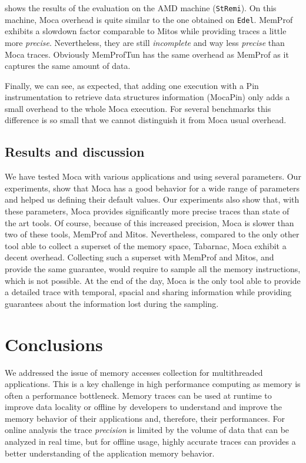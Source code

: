  shows the results of the evaluation on the AMD machine
(\texttt{StRemi}). On this machine, \gls{Moca} overhead is quite similar to the one
obtained on \texttt{Edel}.
\gls{MemProf} exhibits a slowdown factor comparable to \gls{Mitos} while
providing traces a little more \emph{precise}. Nevertheless, they are still \emph{incomplete} and
way less \emph{precise} than \gls{Moca} traces. Obviously MemProfTun has the same
overhead as \gls{MemProf} as it captures the same amount of data.

Finally, we can see, as expected, that adding one execution with a Pin instrumentation to retrieve data structures information (MocaPin) only adds a small overhead to the whole \gls{Moca} execution.
For several benchmarks this difference is so small that we cannot distinguish it from \gls{Moca} usual overhead.

\subsection{Results and discussion}

We have tested \gls{Moca} with various applications and using several parameters.
Our experiments, show that \gls{Moca} has a good behavior for a wide range of parameters and helped us defining their default values.
Our experiments also show that, with these parameters, \gls{Moca} provides significantly more precise traces than state of the art tools.
Of course, because of this increased precision, \gls{Moca} is slower than two of these tools, \gls{MemProf} and \gls{Mitos}.
Nevertheless, compared to the only other tool able to collect a superset of the memory space, \gls{Tabarnac}, \gls{Moca} exhibit a decent overhead.
Collecting such a superset with \gls{MemProf} and \gls{Mitos}, and provide the same guarantee, would require to sample all the memory instructions, which is not possible.
At the end of the day, \gls{Moca} is the only tool able to provide a detailed trace with temporal, spacial and sharing information while providing guarantees about the information lost during the sampling.

\section{Conclusions}
\label{sec:moca-cncl}

We addressed the issue of memory accesses collection for multithreaded applications.
This is a key challenge in high performance computing as memory is often a performance bottleneck.
Memory traces can be used at runtime to improve data locality or offline by developers to understand and improve the memory behavior of their applications and, therefore, their performances.
For online analysis the trace \emph{precision} is limited by the volume of data that can be analyzed in real time, but for offline usage, highly accurate traces can provides a better understanding of the application memory behavior.

